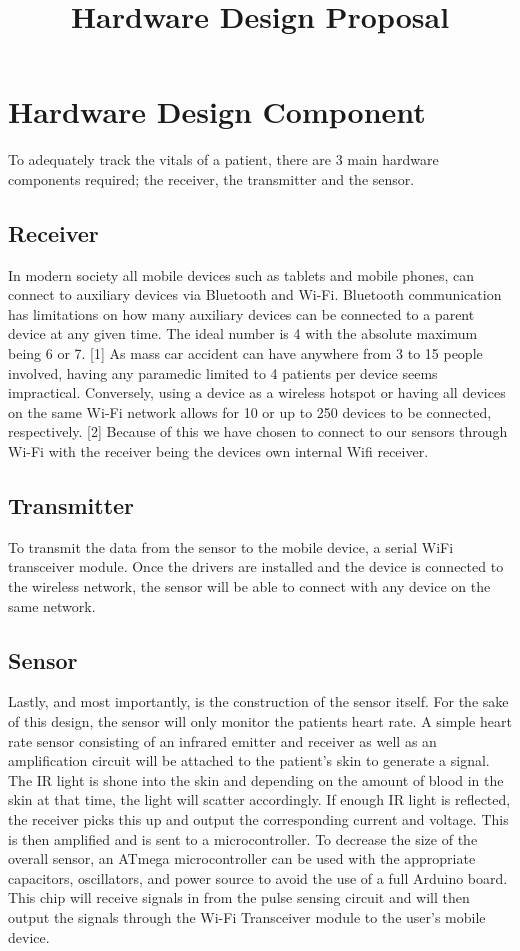 \documentclass{article}
\title{Hardware Design Proposal}
\begin{document}
\newpage

\maketitle
\section{Hardware Design Component}

To adequately track the vitals of a patient, there are 3 main hardware components required; the receiver, the transmitter and the sensor. 

\subsection{Receiver}
In modern society all mobile devices such as tablets and mobile phones, can connect to auxiliary devices via Bluetooth and Wi-Fi. Bluetooth communication has limitations on how many auxiliary devices can be connected to a parent device at any given time. The ideal number is 4 with the absolute maximum being 6 or 7. [1] As mass car accident can have anywhere from 3 to 15 people involved, having any paramedic limited to 4 patients per device seems impractical. Conversely, using a device as a wireless hotspot or having all devices on the same Wi-Fi network allows for 10 or up to 250 devices to be connected, respectively. [2] Because of this we have chosen to connect to our sensors through Wi-Fi with the receiver being the devices own internal Wifi receiver. 

\subsection{Transmitter}
To transmit the data from the sensor to the mobile device, a serial WiFi transceiver module. Once the drivers are installed and the device is connected to the wireless network, the sensor will be able to connect with any device on the same network. 

\subsection{Sensor}
Lastly, and most importantly, is the construction of the sensor itself. For the sake of this design, the sensor will only monitor the patients heart rate. A simple heart rate sensor consisting of an infrared emitter and receiver as well as an amplification circuit will be attached to the patient’s skin to generate a signal. The IR light is shone into the skin and depending on the amount of blood in the skin at that time, the light will scatter accordingly. If enough IR light is reflected, the receiver picks this up and output the corresponding current and voltage. This is then amplified and is sent to a microcontroller. 
To decrease the size of the overall sensor, an ATmega microcontroller can be used with the appropriate capacitors, oscillators, and power source to avoid the use of a full Arduino board. This chip will receive signals in from the pulse sensing circuit and will then output the signals through the Wi-Fi Transceiver module to the user’s mobile device. 
\end{document}
